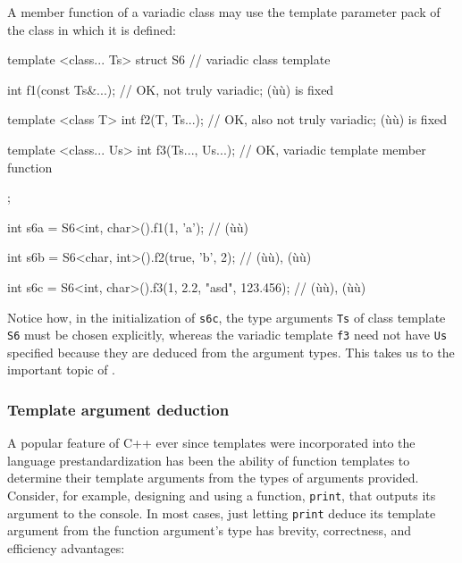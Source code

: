 A member function of a variadic class may use the template parameter
pack of the class in which it is defined:

\begin{emcppslisting}
template <class... Ts>
struct S6                  // variadic class template
{
    int f1(const Ts&...);  // OK, not truly variadic; (ù{}ù) is fixed

    template <class T>
    int f2(T, Ts...);      // OK, also not truly variadic; (ù{}ù) is fixed

    template <class... Us>
    int f3(Ts..., Us...);  // OK, variadic template member function
};

int s6a = S6<int, char>().f1(1, 'a');
    // (ù{}ù)

int s6b = S6<char, int>().f2(true, 'b', 2);
    // (ù{}ù), (ù{}ù)

int s6c = S6<int, char>().f3(1, 2.2, "asd", 123.456);
    // (ù{}ù), (ù{}ù)
\end{emcppslisting}
    

\noindent Notice how, in the initialization of \lstinline!s6c!, the type arguments
\lstinline!Ts! of class template \lstinline!S6! must be chosen explicitly,
whereas the variadic template \lstinline!f3! need not have \lstinline!Us!
specified because they are deduced from the argument types. This takes
us to the important topic of .

\subsubsection[Template argument deduction]{Template argument deduction}\label{template-argument-deduction}

A popular feature of C++ ever since templates were incorporated into the
language prestandardization has been the ability of function templates
to determine their template arguments from the types of arguments
provided. Consider, for example, designing and using a function,
\lstinline!print!, that outputs its argument to the console. In most cases,
just letting \lstinline!print! deduce its template argument from the
function argument's type has brevity, correctness, and efficiency
advantages:


